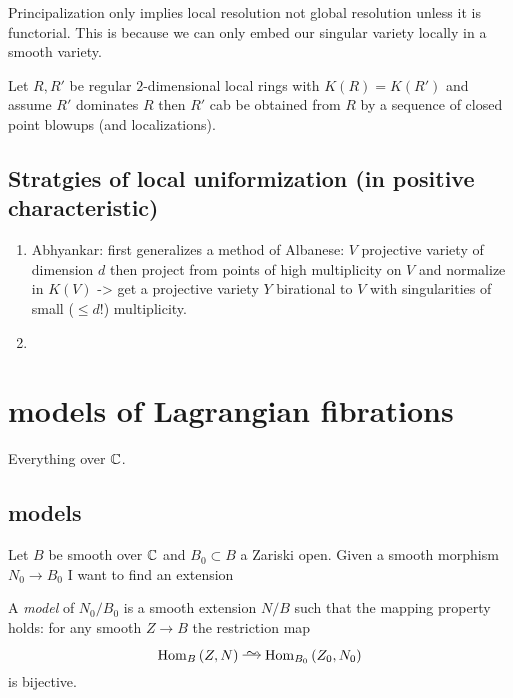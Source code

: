 \documentclass[12pt]{article}
\begin{document}
\begin{rmk}
Principalization only implies local resolution not global resolution unless it is functorial. This is because we can only embed our singular variety locally in a smooth variety. 
\end{rmk}

\begin{lemma}
Let $R, R'$ be regular $2$-dimensional local rings with $K(R) = K(R')$ and assume $R'$ dominates $R$ then $R'$ cab be obtained from $R$ by a sequence of closed point blowups (and localizations).  
\end{lemma}

\subsection{Stratgies of local uniformization (in positive characteristic)}

\begin{enumerate}
\item Abhyankar: first generalizes a method of Albanese: $V$ projective variety of dimension $d$ then project from points of high multiplicity on $V$ and normalize in $K(V)$ -> get a projective variety $Y$ birational to $V$ with singularities of small ($\le d!$) multiplicity.
\item  
\end{enumerate}

\section{\Neron models of Lagrangian fibrations}

Everything over $\mathbb{C}$. 

\subsection{\Neron models}

Let $B$ be smooth over $\mathbb{C}$ and $B_0 \subset B$ a Zariski open. Given a smooth morphism $N_0 \to B_0$ I want to find an extension
\begin{center}
\end{center}
A \textit{\Neron model} of $N_0 / B_0$ is a smooth extension $N / B$ such that the \Neron mapping property holds: for any smooth $Z \to B$ the restriction map
\[ \Hom{B}{Z}{N} \iso \Hom{B_0}{Z_0}{N_0} \]
is bijective. 
\end{document}
